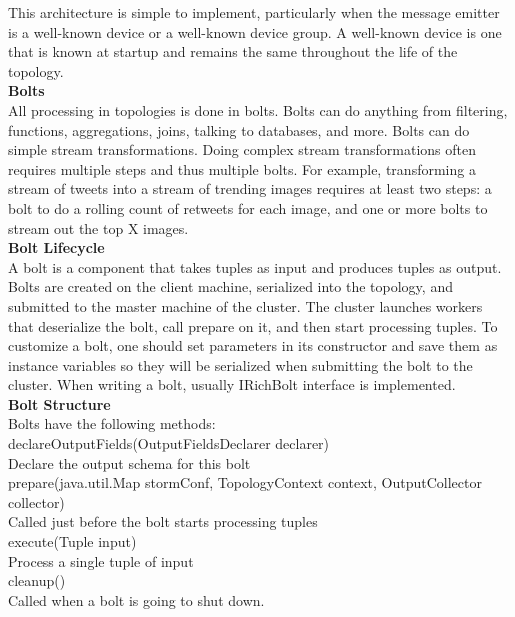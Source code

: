This architecture is simple to implement, particularly when the message emitter is a well-known device or a well-known device group. A well-known device is one that is known at startup and remains the same throughout the life of the topology.\\[2mm]
{\bfseries Bolts}\\[2mm]
All processing in topologies is done in bolts. Bolts can do anything from filtering, functions, aggregations, joins, talking to databases, and more.
Bolts can do simple stream transformations. Doing complex stream transformations often requires multiple steps and thus multiple bolts. For example, transforming a stream of tweets into a stream of trending images requires at least two steps: a bolt to do a rolling count of retweets for each image, and one or more bolts to stream out the top X images.\\[2mm]
{\bfseries Bolt Lifecycle}\\[2mm]
A bolt is a component that takes tuples as input and produces tuples as output. Bolts are created on the client machine, serialized into the topology, and submitted to the master machine of the cluster. The cluster launches workers that deserialize the bolt, call prepare on it, and then start processing tuples. To customize a bolt, one should set parameters in its constructor and save them as instance variables so they will be serialized when submitting the bolt to the cluster. When writing a bolt, usually IRichBolt interface is implemented.\\[2mm]
{\bfseries Bolt Structure}\\[2mm]
Bolts have the following methods:\\[2mm]
declareOutputFields(OutputFieldsDeclarer declarer)\\[2mm]
Declare the output schema for this bolt\\[2mm]
prepare(java.util.Map stormConf, TopologyContext context, OutputCollector collector)\\[2mm]
Called just before the bolt starts processing tuples\\[2mm]
execute(Tuple input)\\[2mm]
Process a single tuple of input\\[2mm]
cleanup()\\[2mm]
Called when a bolt is going to shut down.

